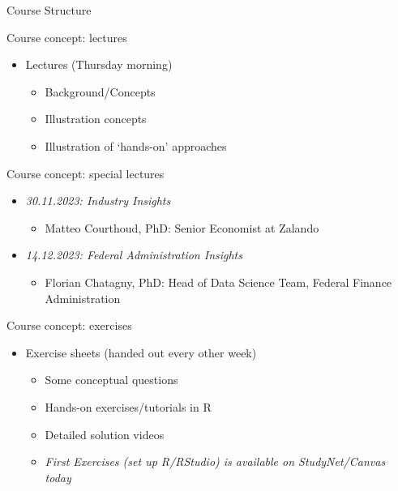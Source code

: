 \documentclass[
  ignorenonframetext,
]{beamer}
\providecommand{\tightlist}{%
  \setlength{\itemsep}{0pt}\setlength{\parskip}{0pt}}
\begin{document}
\begin{frame}[fragile]{Course Structure}
\protect\hypertarget{course-structure}{}
\begin{block}{Course concept: lectures}
\protect\hypertarget{course-concept-lectures}{}
\begin{itemize}
\tightlist
\item
  Lectures (Thursday morning)

  \begin{itemize}
  \tightlist
  \item
    Background/Concepts
  \item
    Illustration concepts
  \item
    Illustration of `hands-on' approaches
  \end{itemize}
\end{itemize}
\end{block}

\begin{block}{Course concept: special lectures}
\protect\hypertarget{course-concept-special-lectures}{}
\begin{itemize}
\tightlist
\item
  \emph{30.11.2023: Industry Insights}

  \begin{itemize}
  \tightlist
  \item
    Matteo Courthoud, PhD: Senior Economist at Zalando
  \end{itemize}
\end{itemize}

\begin{itemize}
\tightlist
\item
  \emph{14.12.2023: Federal Administration Insights}

  \begin{itemize}
  \tightlist
  \item
    Florian Chatagny, PhD: Head of Data Science Team, Federal Finance
    Administration
  \end{itemize}
\end{itemize}
\end{block}

\begin{block}{Course concept: exercises}
\protect\hypertarget{course-concept-exercises}{}
\begin{itemize}
\tightlist
\item
  Exercise sheets (handed out every other week)

  \begin{itemize}
  \tightlist
  \item
    Some conceptual questions
  \item
    Hands-on exercises/tutorials in R
  \item
    Detailed solution videos
  \item
    \emph{First Exercises (set up R/RStudio) is available on
    StudyNet/Canvas today}
  \end{itemize}
\end{itemize}
\end{block}


\end{frame}
\end{document}
